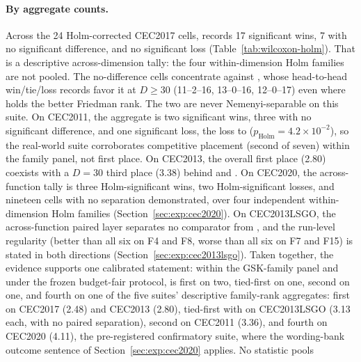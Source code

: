 \paragraph{By aggregate counts.}
Across the 24 Holm-corrected CEC2017 cells, \dtgsk{} records 17
significant wins, 7 with no significant difference, and no significant loss
(Table~\ref{tab:wilcoxon-holm}). That is a descriptive across-dimension tally:
the four within-dimension Holm families are not pooled. The
no-difference cells concentrate against
\egsk{}, whose head-to-head win/tie/loss records favor it at
$D \geq 30$ (11--2--16, 13--0--16, 12--0--17) even where \dtgsk{}
holds the better Friedman rank. The two are never
Nemenyi-separable on this suite.
On CEC2011, the aggregate is two significant wins, three with no
significant difference, and one significant loss, the loss to \egsk{}
($p_{\mathrm{Holm}} = 4.2 \times 10^{-2}$), so the real-world
suite corroborates competitive placement (second of seven) within the
family panel, not first place.
On CEC2013, the overall first place (2.80) coexists with a $D = 30$
third place (3.38) behind \egsk{} and \atmals{}.
On CEC2020, the across-function tally is three Holm-significant wins,
two Holm-significant losses, and nineteen cells with no separation
demonstrated, over four independent within-dimension Holm families
(Section~\ref{sec:exp:cec2020}).
On CEC2013LSGO, the across-function paired layer separates no comparator
from \dtgsk{}, and the run-level regularity (better than all six on
F4 and F8, worse than all six on F7 and F15) is stated in both
directions (Section~\ref{sec:exp:cec2013lsgo}).
Taken together, the evidence supports one calibrated statement:
within the GSK-family panel and under the frozen budget-fair
protocol, \dtgsk{} is first on two, tied-first on one, second on one,
and fourth on one of the five suites' descriptive family-rank
aggregates: first on CEC2017 (2.48) and CEC2013 (2.80), tied-first
with \agsk{} on CEC2013LSGO (3.13 each, with no paired separation),
second on CEC2011 (3.36), and fourth on CEC2020 (4.11), the
pre-registered confirmatory suite, where the wording-bank outcome
sentence of Section~\ref{sec:exp:cec2020} applies. No statistic pools
